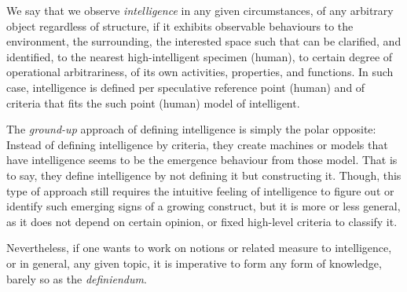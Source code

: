 \begin{definition}
    We say that we observe \textit{intelligence} in any given circumstances, of any arbitrary object regardless of structure, if it exhibits observable behaviours to the environment, the surrounding, the interested space such that can be clarified, and identified, to the nearest high-intelligent specimen (human), to certain degree of operational arbitrariness, of its own activities, properties, and functions. In such case, intelligence is defined per speculative reference point (human) and of criteria that fits the such point (human) model of intelligent. 
\end{definition}

The \textit{ground-up} approach of defining intelligence is simply the polar opposite: Instead of defining intelligence by criteria, they create machines or models that have intelligence seems to be the emergence behaviour from those model. That is to say, they define intelligence by not defining it but constructing it. Though, this type of approach still requires the intuitive feeling of intelligence to figure out or identify such emerging signs of a growing construct, but it is more or less general, as it does not depend on certain opinion, or fixed high-level criteria to classify it. 

Nevertheless, if one wants to work on notions or related measure to intelligence, or in general, any given topic, it is imperative to form any form of knowledge, barely so as the \textit{definiendum}. 
